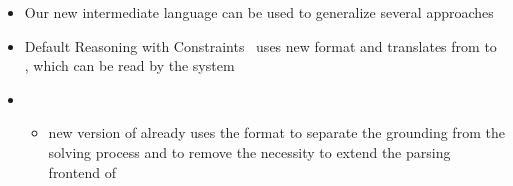 \begin{itemize}
\item Our new intermediate language \aspif{} can be used to generalize several approaches
\item Default Reasoning with Constraints~\cite{bakakaossc16a} uses new \aspif{} format and translates from \aspif{} to \aspif,
which can be read by the \clingcon{} system
\item \clingcon
  \begin{itemize}
	\item new version of \clingcon{} already uses the \aspif{} format to separate the grounding from the solving process
	and to remove the necessity to extend the parsing frontend of \gringo

\end{itemize}
\end{itemize}
